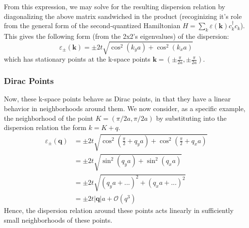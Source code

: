 \documentclass[10pt,a4paper]{article}\usepackage[]{graphicx}\usepackage[]{color}
\begin{document}
\begin{multicols}{2}
From this expression, we may solve for the resulting dispersion relation by diagonalizing the above matrix sandwiched in the product (recoginizing it's role from the general form of the second-quantized Hamiltonian $H=\sum_k \varepsilon(\mathbf{k})c^{\dagger}_kc_k$). This gives the following form (from the 2x2's eigenvalues) of the dispersion:
$$
\varepsilon_{\pm}(\mathbf{k}) = \pm 2t\sqrt{\cos^2(k_y a)+\cos^2(k_x a)}
$$
which has stationary points at the k-space points $\mathbf{k}= (\pm\frac{\pi}{2a},\pm\frac{\pi}{2a})$.

\subsubsection{Dirac Points}
Now, these k-space points behave as Dirac points, in that they have a linear behavior in neighborhoods around them. We now consider, as a specific example, the neighborhood of the point $K=(\pi/2a, \pi/2a)$ by substituting into the dispersion relation the form $k=K+q$. 
\begin{align*}
\varepsilon_{\pm}(\mathbf{q})&=\pm 2t\sqrt{\cos^2\left(\frac{\pi}{2}+q_y a\right)+\cos^2\left(\frac{\pi}{2}+q_x a\right)}\\
& = \pm 2t\sqrt{\sin^2\left(q_y a\right)+\sin^2\left(q_x a\right)}\\
& = \pm 2t\sqrt{(q_y a + ...)^2+(q_x a + ...)^2}\\
& =\pm 2t |\mathbf{q}|a+\mathcal{O}(q^3)
\end{align*}
Hence, the dispersion relation around these points acts linearly in sufficiently small neighborhoods of these points.


\end{multicols}
\end{document}
